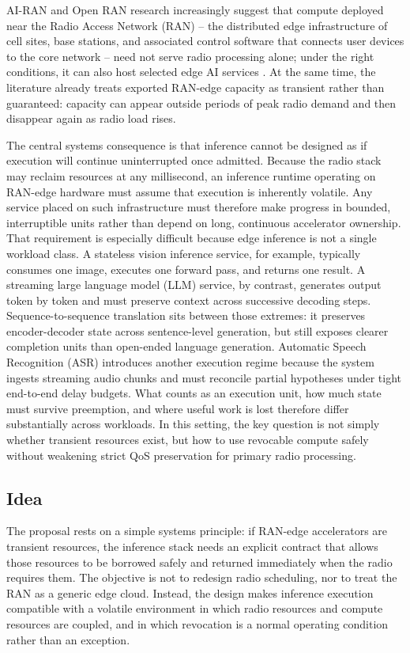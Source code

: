 \documentclass[a4paper,11pt]{article}
\begin{document}
AI-RAN and Open RAN research increasingly suggest that compute deployed near the Radio Access Network (RAN) -- the distributed edge infrastructure of cell sites, base stations, and associated control software that connects user devices to the core network -- need not serve radio processing alone; under the right conditions, it can also host selected edge AI services \cite{beyond,airan,openairan}. At the same time, the literature already treats exported RAN-edge capacity as transient rather than guaranteed: capacity can appear outside periods of peak radio demand and then disappear again as radio load rises.

The central systems consequence is that inference cannot be designed as if execution will continue uninterrupted once admitted. Because the radio stack may reclaim resources at any millisecond, an inference runtime operating on RAN-edge hardware must assume that execution is inherently volatile. Any service placed on such infrastructure must therefore make progress in bounded, interruptible units rather than depend on long, continuous accelerator ownership. That requirement is especially difficult because edge inference is not a single workload class. A stateless vision inference service, for example, typically consumes one image, executes one forward pass, and returns one result. A streaming large language model (LLM) service, by contrast, generates output token by token and must preserve context across successive decoding steps. Sequence-to-sequence translation sits between those extremes: it preserves encoder-decoder state across sentence-level generation, but still exposes clearer completion units than open-ended language generation. Automatic Speech Recognition (ASR) introduces another execution regime because the system ingests streaming audio chunks and must reconcile partial hypotheses under tight end-to-end delay budgets. What counts as an execution unit, how much state must survive preemption, and where useful work is lost therefore differ substantially across workloads. In this setting, the key question is not simply whether transient resources exist, but how to use revocable compute safely without weakening strict QoS preservation for primary radio processing.

\subsection{Idea}

The proposal rests on a simple systems principle: if RAN-edge accelerators are transient resources, the inference stack needs an explicit contract that allows those resources to be borrowed safely and returned immediately when the radio requires them. The objective is not to redesign radio scheduling, nor to treat the RAN as a generic edge cloud. Instead, the design makes inference execution compatible with a volatile environment in which radio resources and compute resources are coupled, and in which revocation is a normal operating condition rather than an exception.
\end{document}
